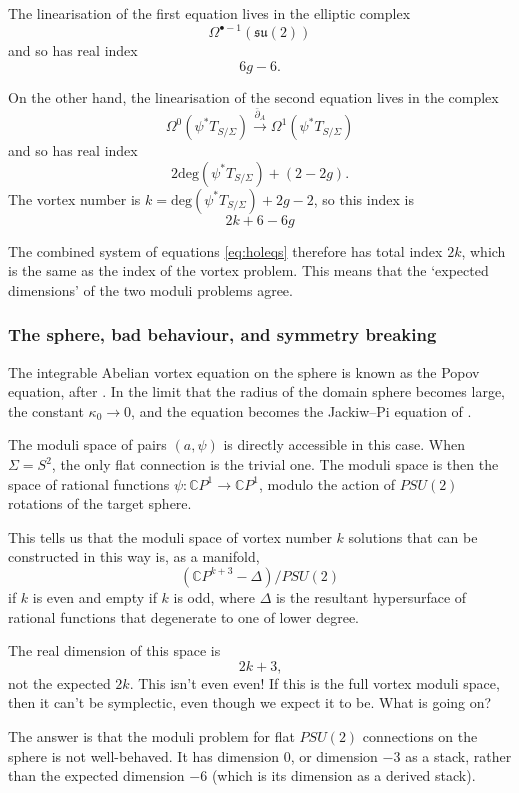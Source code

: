 \documentclass[10pt]{article}
\newcommand{\db}{\bar{\partial}}
\theoremstyle{definition}
\begin{document}
The linearisation of the first equation lives in the elliptic complex
\[
\Omega^{\bullet-1}( \mathfrak{su}(2))
\]
and so has real index
\[
6g-6 \text{.}
\]

On the other hand, the linearisation of the second equation lives in the complex
\[
\Omega^0(\psi^*T_{S/\Sigma}) \xrightarrow{\db_A} \Omega^1(\psi^*T_{S/\Sigma})
\]
and so has real index
\[
2 \text{deg}(\psi^*T_{S/\Sigma}) + (2-2g) \text{.}
\]
The vortex number is \(k = \text{deg}(\psi^*T_{S/\Sigma}) + 2g-2\), so this index is 
\[
2 k + 6 - 6g
\]


The combined system of equations \eqref{eq:holeqs} therefore has total index \(2k\), which is the same as the index of the vortex problem. This means that the `expected dimensions' of the two moduli problems agree. 

\subsubsection{The sphere, bad behaviour, and symmetry breaking}

The integrable Abelian vortex equation on the sphere is known as the Popov equation, after \cite{popovIV}. In the limit that the radius of the domain sphere becomes large, the constant \(\kappa_0 \to 0\), and the equation becomes the Jackiw--Pi equation of \cite{jackiwSSS}. 

The moduli space of pairs \((a, \psi)\) is directly accessible in this case. When \(\Sigma = S^2\), the only flat connection is the trivial one. The moduli space is then the space of rational functions \(\psi : \mathbb{C}P^1 \to \mathbb{C}P^1\), modulo the action of \(PSU(2)\) rotations of the target sphere.

This tells us that the moduli space of vortex number \(k\) solutions that can be constructed in this way is, as a manifold,
\[
\left( \mathbb{C}P^{k+3} - \Delta \right)/PSU(2)
\]
if \(k\) is even and empty if \(k\) is odd, where \(\Delta\) is the resultant hypersurface of rational functions that degenerate to one of lower degree.

The real dimension of this space is 
\[
2k + 3 \text{,}
\]
not the expected \(2k\). This isn't even even! If this is the full vortex moduli space, then it can't be symplectic, even though we expect it to be. What is going on?

The answer is that the moduli problem for flat \(PSU(2)\) connections on the sphere is not well-behaved. It has dimension 0, or dimension \(-3\) as a stack, rather than the expected dimension \(-6\) (which is its dimension as a derived stack).
\end{document}
